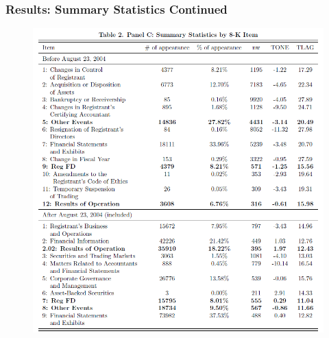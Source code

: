 \documentclass{beamer}
\begin{document}
\begin{frame}
	\frametitle{Results: Summary Statistics Continued}
	\begin{figure}[h]
		\centering
		\includegraphics[width=0.6\linewidth]{tab2panC}
		\label{tab2panC}
	\end{figure}
	
\end{frame}
\end{document}
